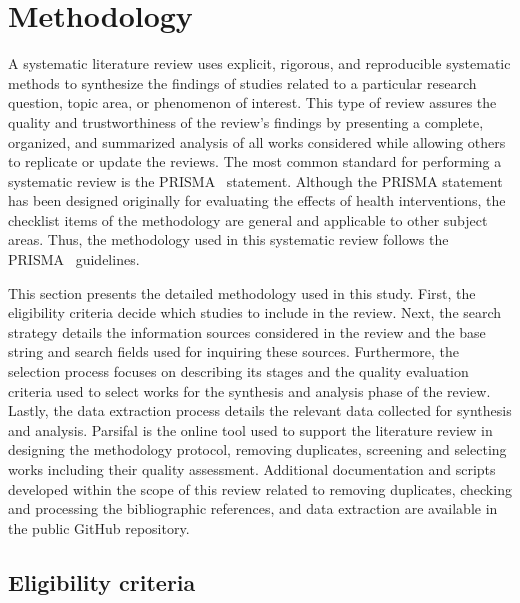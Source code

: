 \section{Methodology}
\label{sec:methodology}

A systematic literature review uses explicit, rigorous, and reproducible systematic methods to synthesize the findings of studies related to a particular research question, topic area, or phenomenon of interest. This type of review assures the quality and trustworthiness of the review's findings by presenting a complete, organized, and summarized analysis of all works considered while allowing others to replicate or update the reviews. The most common standard for performing a systematic review is the PRISMA~\parencite{methodology:prisma} statement. Although the PRISMA statement has been designed originally for evaluating the effects of health interventions, the checklist items of the methodology are general and applicable to other subject areas. Thus, the methodology used in this systematic review follows the PRISMA~\parencite{methodology:prisma} guidelines.

This section presents the detailed methodology used in this study. First, the eligibility criteria decide which studies to include in the review. Next, the search strategy details the information sources considered in the review and the base string and search fields used for inquiring these sources. Furthermore, the selection process focuses on describing its stages and the quality evaluation criteria used to select works for the synthesis and analysis phase of the review. Lastly, the data extraction process details the relevant data collected for synthesis and analysis.
Parsifal \parencite{methodology:parsifal} is the online tool used to support the literature review in designing the methodology protocol, removing duplicates, screening and selecting works including their quality assessment. Additional documentation and scripts developed within the scope of this review related to removing duplicates, checking and processing the bibliographic references, and data extraction are available in the public GitHub repository.

\subsection{Eligibility criteria}
\label{sec:methodology:eligible}

